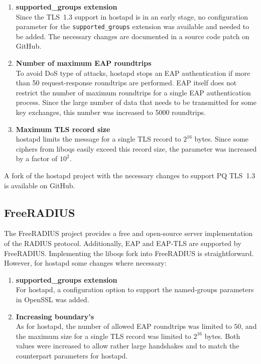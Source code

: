 \begin{enumerate}
    \item \textbf{supported\_groups extension} \\
    Since the TLS~1.3 support in hostapd is in an early stage, no configuration parameter for the \texttt{supported\_groups} extension was available and needed to be added. The necessary changes are documented in a source code patch on GitHub.
    \item \textbf{Number of maximum \ac{EAP} roundtrips} \\
    To avoid DoS type of attacks, hostapd stops an \ac{EAP} authentication if more than 50 request-response roundtrips are performed. \ac{EAP} itself does not restrict the number of maximum roundtrips for a single \ac{EAP} authentication process. Since the large number of data that needs to be transmitted for some key exchanges, this number was increased to 5000 roundtrips.
    \item \textbf{Maximum TLS record size} \\
    hostapd limits the message for a single TLS record to \(2^{16}\) bytes. Since some ciphers from liboqs easily exceed this record size, the parameter was increased by a factor of \(10^2\).
\end{enumerate}

A fork of the hostapd project with the necessary changes to support PQ TLS~1.3 is available on GitHub.

\subsection{FreeRADIUS}

The FreeRADIUS project provides a free and open-source server implementation of the RADIUS protocol. Additionally, \ac{EAP} and EAP-TLS are supported by FreeRADIUS. Implementing the liboqs fork into FreeRADIUS is straightforward. However, for hostapd some changes where necessary:

\begin{enumerate}
    \item \textbf{supported\_groups extension} \\
    For hostapd, a configuration option to support the named-groups parameters in OpenSSL was added.
    \item \textbf{Increasing boundary's} \\
    As for hostapd, the number of allowed \ac{EAP} roundtrips was limited to \(50\), and the maximum size for a single TLS record was limited to \(2^{16}\) bytes. Both values were increased to allow rather large handshakes and to match the counterpart parameters for hostapd.
\end{enumerate}

